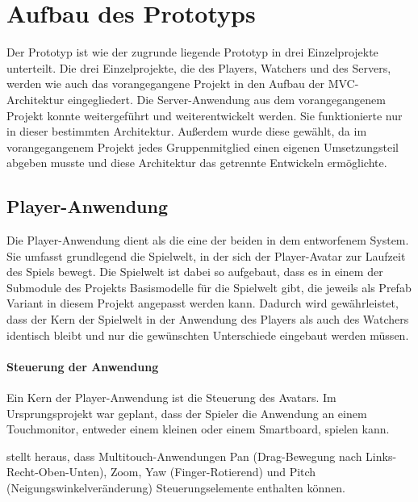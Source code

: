 \section{Aufbau des Prototyps}
Der Prototyp ist wie der zugrunde liegende Prototyp in drei Einzelprojekte unterteilt. Die drei Einzelprojekte, die des Players, Watchers und des Servers, werden wie auch das vorangegangene Projekt in den Aufbau der \ac{MVC}-Architektur eingegliedert. Die Server-Anwendung aus dem vorangegangenem Projekt konnte weitergeführt und weiterentwickelt werden. Sie funktionierte nur in dieser bestimmten Architektur. Außerdem wurde diese gewählt, da im vorangegangenem Projekt jedes Gruppenmitglied einen eigenen Umsetzungsteil abgeben musste und diese Architektur das getrennte Entwickeln ermöglichte.

\subsection{Player-Anwendung}
Die Player-Anwendung dient als die eine der beiden  in dem entworfenem System. Sie umfasst grundlegend die Spielwelt, in der sich der Player-Avatar zur Laufzeit des Spiels bewegt. Die Spielwelt ist dabei so aufgebaut, dass es in einem der Submodule des Projekts Basismodelle für die Spielwelt gibt, die jeweils als Prefab Variant in diesem Projekt angepasst werden kann. Dadurch wird gewährleistet, dass der Kern der Spielwelt in der Anwendung des Players als auch des Watchers identisch bleibt und nur die gewünschten Unterschiede eingebaut werden müssen.

\paragraph{Steuerung der Anwendung}
Ein Kern der Player-Anwendung ist die Steuerung des Avatars. Im Ursprungsprojekt war geplant, dass der Spieler die Anwendung an einem Touchmonitor, entweder einem kleinen oder einem Smartboard, spielen kann.

\cite{reinhard_augmented_2022} stellt heraus, dass Multitouch-Anwendungen Pan (Drag-Bewegung nach Links-Recht-Oben-Unten), Zoom, Yaw (Finger-Rotierend) und Pitch (Neigungswinkelveränderung) Steuerungselemente enthalten können. 

